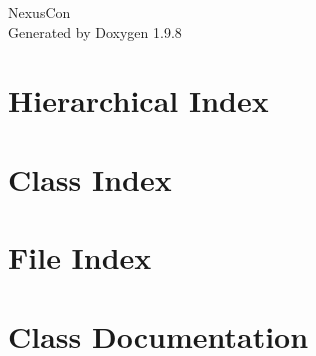 \documentclass[twoside]{book}
\newcommand{\+}{\discretionary{\mbox{\scriptsize$\hookleftarrow$}}{}{}}
\newcommand{\clearemptydoublepage}{%
    \newpage{\pagestyle{empty}\cleardoublepage}%
  }
\begin{document}
  \raggedbottom
    \hypersetup{pageanchor=false,
                bookmarksnumbered=true,
                pdfencoding=unicode
               }
  \begin{titlepage}
  \vspace*{7cm}
  \begin{center}%
  {\Large Nexus\+Con}\\
  \vspace*{1cm}
  {\large Generated by Doxygen 1.9.8}\\
  \end{center}
  \end{titlepage}
  \clearemptydoublepage
  \tableofcontents
  \clearemptydoublepage
  \hypersetup{pageanchor=true}
\chapter{Hierarchical Index}

\chapter{Class Index}

\chapter{File Index}

\chapter{Class Documentation}
































\end{document}

